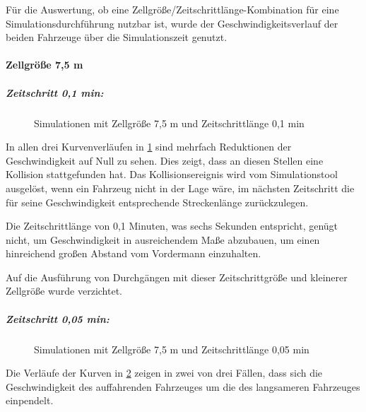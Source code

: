 Für die Auswertung, ob eine Zellgröße/Zeitschrittlänge-Kombination für eine Simulationsdurchführung nutzbar ist, wurde der Geschwindigkeitsverlauf der beiden Fahrzeuge über die Simulationszeit genutzt.


\paragraph*{Zellgröße 7,5 m} \hfill
\subparagraph*{Zeitschritt 0,1 min:}
\begin{figure}[hptb]
  \centering 
   \qquad 
   \qquad 
  \caption{Simulationen mit Zellgröße 7,5 m und Zeitschrittlänge 0,1 min} 
  \label{figure:run1-3}
\end{figure}
In allen drei Kurvenverläufen in \cref{figure:run1-3} sind mehrfach Reduktionen der Geschwindigkeit auf Null zu sehen. 
Dies zeigt, dass an diesen Stellen eine Kollision stattgefunden hat. Das Kollisionsereignis wird vom Simulationstool ausgelöst, wenn ein Fahrzeug nicht in der Lage wäre, im nächsten Zeitschritt die für seine Geschwindigkeit entsprechende Streckenlänge zurückzulegen.

Die Zeitschrittlänge von 0,1 Minuten, was sechs Sekunden entspricht, genügt nicht, um Geschwindigkeit in ausreichendem Maße abzubauen, um einen hinreichend großen Abstand vom Vordermann einzuhalten.

Auf die Ausführung von Durchgängen mit dieser Zeitschrittgröße und kleinerer Zellgröße wurde verzichtet.


\subparagraph*{Zeitschritt 0,05 min:}
\begin{figure}[hptb]
  \centering 
   \qquad 
   \qquad 
  \caption{Simulationen mit Zellgröße 7,5 m und Zeitschrittlänge 0,05 min} 
  \label{figure:run4-6}
\end{figure}
Die Verläufe der Kurven in \cref{figure:run4-6} zeigen in zwei von drei Fällen, dass sich die Geschwindigkeit des auffahrenden Fahrzeuges um die des langsameren Fahrzeuges einpendelt.

